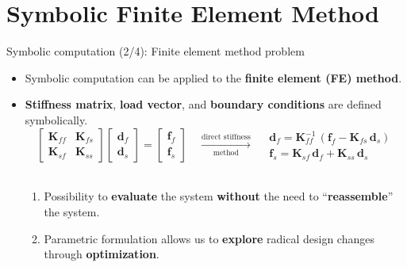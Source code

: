 \section{Symbolic Finite Element Method}

\begin{frame}{Symbolic computation (2/4): Finite element method problem}
  \begin{itemize}
    \item Symbolic computation can be applied to the \textbf{finite element (FE) method}. \\[0.5em]
    \item \textbf{Stiffness matrix}, \textbf{load vector}, and \textbf{boundary conditions} are defined symbolically. \\[0.5em]
    \begin{equation*}
      \left[\begin{array}{cc}
        \mathbf{K}_{ff} & \mathbf{K}_{fs} \\[0.5em]
        \mathbf{K}_{sf} & \mathbf{K}_{ss}
      \end{array}\right] \left[\begin{array}{c}
        \mathbf{d}_{f} \\[0.5em]
        \mathbf{d}_{s}
      \end{array}\right] = \left[\begin{array}{c}
        \mathbf{f}_{f} \\[0.5em]
        \mathbf{f}_{s}
      \end{array}\right]
      \quad \xrightarrow[\text{method}]{\text{direct stiffness}} \quad
      \begin{array}{c}
        \mathbf{d}_{f} = \mathbf{K}_{ff}^{-1}\,\left(\mathbf{f}_{f} - \mathbf{K}_{fs}\,\mathbf{d}_{s}\right) \\[0.5em]
        \mathbf{f}_{s} = \mathbf{K}_{sf}\,\mathbf{d}_{f} + \mathbf{K}_{ss}\,\mathbf{d}_{s}
      \end{array}
    \end{equation*} \\[0.5em]
    \begin{enumerate}
      \item Possibility to \textbf{evaluate} the system \textbf{without} the need to ``\textbf{reassemble}'' the system. \\[0.5em]
      \item Parametric formulation allows us to \textbf{explore} radical design changes through \textbf{optimization}. \\[0.4em]

\end{enumerate}
\end{itemize}
\end{frame}
